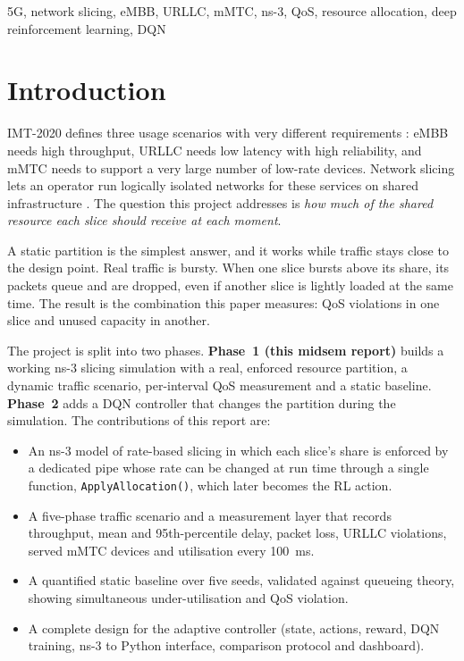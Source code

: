 \documentclass[conference]{IEEEtran}
\begin{document}
\begin{IEEEkeywords}
5G, network slicing, eMBB, URLLC, mMTC, ns-3, QoS, resource allocation, deep reinforcement learning, DQN
\end{IEEEkeywords}

\section{Introduction}
IMT-2020 defines three usage scenarios with very different requirements \cite{itu2083}: eMBB needs high throughput, URLLC needs low latency with high reliability, and mMTC needs to support a very large number of low-rate devices. Network slicing lets an operator run logically isolated networks for these services on shared infrastructure \cite{ts23501,foukas2017}. The question this project addresses is \emph{how much of the shared resource each slice should receive at each moment}.

A static partition is the simplest answer, and it works while traffic stays close to the design point. Real traffic is bursty. When one slice bursts above its share, its packets queue and are dropped, even if another slice is lightly loaded at the same time. The result is the combination this paper measures: QoS violations in one slice and unused capacity in another.

The project is split into two phases. \textbf{Phase~1 (this midsem report)} builds a working ns-3 slicing simulation with a real, enforced resource partition, a dynamic traffic scenario, per-interval QoS measurement and a static baseline. \textbf{Phase~2} adds a DQN controller that changes the partition during the simulation. The contributions of this report are:
\begin{itemize}
\item An ns-3 model of rate-based slicing in which each slice's share is enforced by a dedicated pipe whose rate can be changed at run time through a single function, \texttt{ApplyAllocation()}, which later becomes the RL action.
\item A five-phase traffic scenario and a measurement layer that records throughput, mean and 95th-percentile delay, packet loss, URLLC violations, served mMTC devices and utilisation every 100~ms.
\item A quantified static baseline over five seeds, validated against queueing theory, showing simultaneous under-utilisation and QoS violation.
\item A complete design for the adaptive controller (state, actions, reward, DQN training, ns-3 to Python interface, comparison protocol and dashboard).
\end{itemize}
\end{document}
